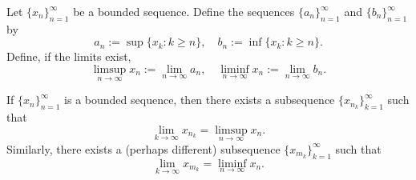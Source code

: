 \documentclass[../main.tex]{subfiles}
\begin{document}
    
    
    
    
    
    
    
    
    
    
    
    
    
    
    
    
    
    
    
    
    
    
    
    
    
    
    \begin{definition} \label{def:limsup_liminf}
    Let \( \{x_n\}_{n=1}^{\infty} \) be a bounded sequence. Define the sequences \( \{a_n\}_{n=1}^{\infty} \) and \( \{b_n\}_{n=1}^{\infty} \) by
    \[
    a_n := \sup\{ x_k : k \geq n \}, \quad b_n := \inf\{ x_k : k \geq n \}.
    \]
    Define, if the limits exist,
    \[
    \limsup_{n \to \infty} x_n := \lim_{n \to \infty} a_n, \quad \liminf_{n \to \infty} x_n := \lim_{n \to \infty} b_n.
    \]
    \end{definition}
    
    
    
    
    
    
    
    
    
    
    
    
    
    
    
    
    
    
    
    
    
    
    
    
    
    
    
    
    
    
    
    
    
    \begin{theorem}\label{thm: lim sup lim inf subsequence}
    If \( \{x_n\}_{n=1}^{\infty} \) is a bounded sequence, then there exists a subsequence \( \{x_{n_k}\}_{k=1}^{\infty} \) such that
    \[
    \lim_{k \to \infty} x_{n_k} = \limsup_{n \to \infty} x_n.
    \]
    Similarly, there exists a (perhaps different) subsequence \( \{x_{m_k}\}_{k=1}^{\infty} \) such that
    \[
    \lim_{k \to \infty} x_{m_k} = \liminf_{n \to \infty} x_n.
    \]
    \end{theorem}
    
\end{document}
